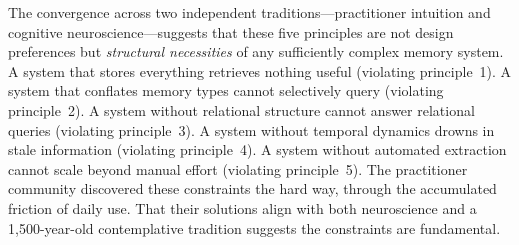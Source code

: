 The convergence across two independent traditions---practitioner
intuition and cognitive neuroscience---suggests that these five
principles are not design
preferences but \emph{structural necessities} of any sufficiently
complex memory system.  A system that stores everything retrieves
nothing useful (violating principle~1).  A system that conflates memory
types cannot selectively query (violating principle~2).  A system
without relational structure cannot answer relational queries (violating
principle~3).  A system without temporal dynamics drowns in stale
information (violating principle~4).  A system without automated
extraction cannot scale beyond manual effort (violating principle~5).
The practitioner community discovered these constraints the hard way,
through the accumulated friction of daily use.  That their solutions
align with both neuroscience and a 1,500-year-old contemplative
tradition suggests the constraints are fundamental.

